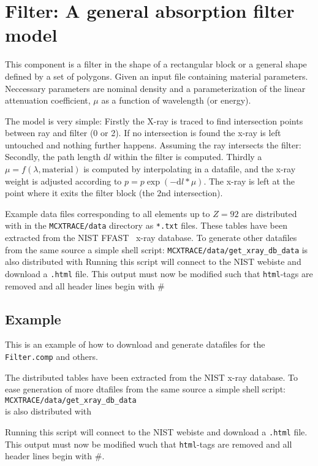 \section{Filter: A general absorption filter model}
\label{s:filter}

This component is a filter in the shape of a rectangular block or a general
shape defined by a set of polygons. Given an input file containing material
parameters. Neccessary parameters are nominal density and a parameterization of
the linear attenuation coefficient, $\mu$ as a function of wavelength (or
energy).

The model is very simple: Firstly the X-ray is traced to find intersection points between ray and filter (0 or 2).
If no intersection is found the x-ray is left untouched and nothing further happens.
Assuming the ray intersects the filter: Secondly, the path length d$l$ within the filter is computed.
Thirdly a $\mu = f(\lambda,\mathrm{material})$ is computed by interpolating in
a datafile, and the x-ray weight is adjusted according to
$p=p\exp(-\mathrm{d}l*\mu)$. The x-ray is left at the point where it exits the
filter block (the $2$nd intersection).

Example data files corresponding to all elements up to $Z=92$ are distributed with \MCX in the
\verb+MCXTRACE/data+ directory as \verb+*.txt+ files. These tables have been
extracted from the NIST FFAST~\cite{NIST-ffast} x-ray database.
To generate other datafiles from the same source a simple shell script:
\verb+MCXTRACE/data/get_xray_db_data+ is also distributed with \MCX
Running this script will connect to the NIST webiste and download a
\verb+.html+ file. This output must now be modified such that \verb+html+-tags
are removed and all header lines begin with $\#$

\subsection{Example}
\label{getNISTdata}
This is an example of how to download and generate datafiles for the \verb+Filter.comp+ and others.

The distributed tables have been extracted from the NIST x-ray database. To ease generation of more dtafiles
from the same source a simple shell script:\\
\verb+MCXTRACE/data/get_xray_db_data+\\
is also distributed with \MCX

Running this script will connect to the NIST webiste and download a \verb+.html+ file. This output must now be modified wuch that \verb+html+-tags
are removed and all header lines begin with $\#$.

